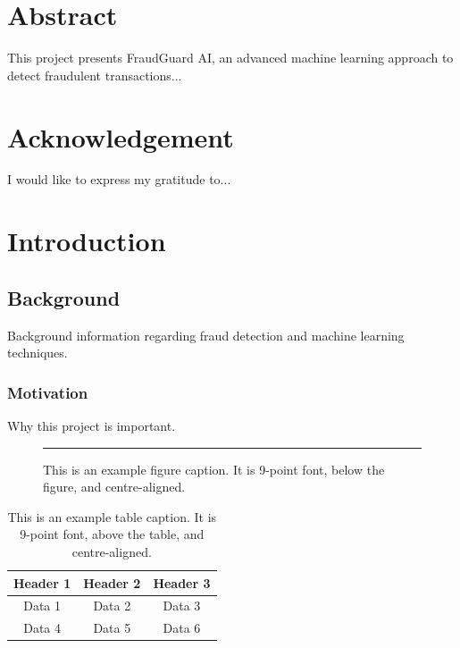 \documentclass[12pt, a4paper]{report}
\begin{document}

\chapter*{Abstract}
This project presents FraudGuard AI, an advanced machine learning approach to detect fraudulent transactions...
\clearpage

\chapter*{Acknowledgement}
I would like to express my gratitude to...
\clearpage

\tableofcontents
\clearpage

\listoffigures
{}
\clearpage

\listoftables
{}
\clearpage

\clearpage
{}


\chapter{Introduction}
\section{Background}
Background information regarding fraud detection and machine learning techniques.
\subsection{Motivation}
Why this project is important.

\begin{figure}[htbp]
    \centering
    \rule{4cm}{3cm} %
    \caption{This is an example figure caption. It is 9-point font, below the figure, and centre-aligned.}
    \label{fig:example}
\end{figure}

\begin{table}[htbp]
    \centering
    \caption{This is an example table caption. It is 9-point font, above the table, and centre-aligned.}
    \begin{tabular}{|c|c|c|}
        \hline
        Header 1 & Header 2 & Header 3 \\
        \hline
        Data 1 & Data 2 & Data 3 \\
        Data 4 & Data 5 & Data 6 \\
        \hline
    \end{tabular}
    \label{tab:example}
\end{table}
\end{document}
